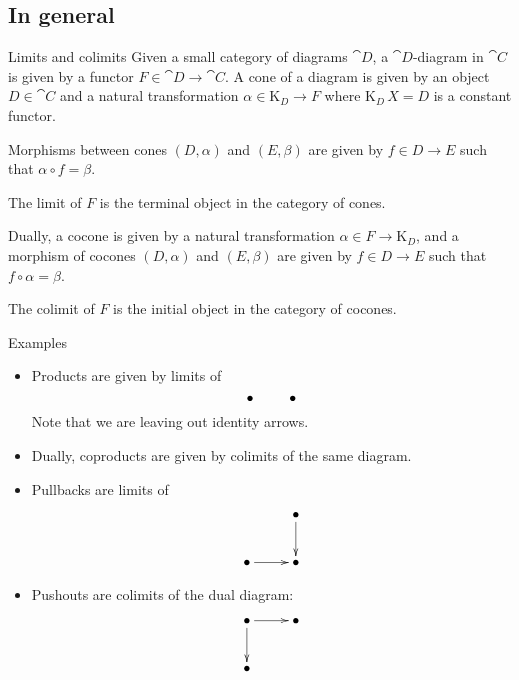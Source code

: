 \documentclass[handout]{beamer}
\begin{document}
\subsection{In general}

\begin{frame}
  \begin{block}{Limits and colimits}
    Given a small category of diagrams $\cat{D}$, a $\cat{D}$-diagram
    in $\cat{C}$ is given by a functor $F\in \cat{D}\to\cat{C}$. A
    cone of a diagram is given by an object $D\in\cat{C}$ and a
    natural transformation $\alpha \in \mathrm{K}_D \to F$ where
    $\mathrm{K}_D\,X = D$ is a constant functor.

    Morphisms between cones $(D,\alpha)$ and $(E,\beta)$ are given by
    $f\in D \to E$ such that $\alpha \circ f = \beta$. 

    The limit of $F$ is the terminal object in the category of cones.

    Dually, a cocone is given by a natural transformation $\alpha \in
    F \to\mathrm{K}_D$, and a morphism of cocones $(D,\alpha)$ and
    $(E,\beta)$ are given by $f\in D \to E$ such that $f \circ \alpha
    = \beta$.

    The colimit of $F$ is the initial object in the category of cocones.
  \end{block}
\end{frame}

\begin{frame}{Examples}

  \begin{itemize}
  \item Products are given by limits of 
    \[\xymatrix@1{\bullet & \bullet}\]
    Note that we are leaving out identity arrows.

  \item Dually, coproducts are given by colimits of the same diagram.

  \item Pullbacks are limits of 
    \[ \xymatrix{
       & \bullet \ar[d] \\
       \bullet \ar[r] & \bullet
     }\]

   \item Pushouts are colimits of the dual diagram:
    \[ \xymatrix{
       \bullet \ar[r]\ar[d] & \bullet \\
       \bullet  
     }\]
     
  \end{itemize}
  
\end{frame}
\end{document}
